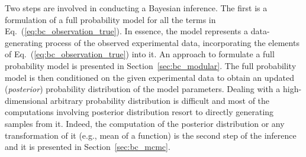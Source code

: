 Two steps are involved in conducting a Bayesian inference.
The first is a formulation of a full probability model for all the terms in Eq.~(\ref{eq:bc_observation_true}).
In essence, the model represents a data-generating process of the observed experimental data,
incorporating the elements of Eq.~(\ref{eq:bc_observation_true}) into it.
An approach to formulate a full probability model is presented in Section~\ref{sec:bc_modular}.
The full probability model is then conditioned on the given experimental data to obtain an updated (\emph{posterior}) probability distribution of the model parameters.
Dealing with a high-dimensional arbitrary probability distribution is difficult and most of the computations involving  posterior distribution resort to directly generating samples from it. 
Indeed, the computation of the posterior distribution or any transformation of it (e.g., mean of a function) is the second step of the inference and it is presented in Section~\ref{sec:bc_mcmc}.

